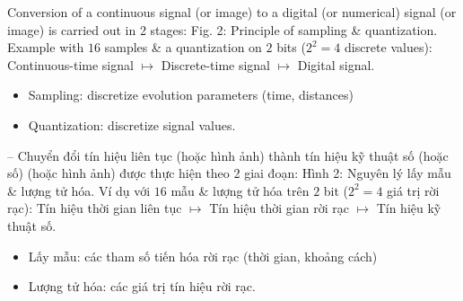\documentclass{article}
\begin{document}
\begin{itemize}
\begin{itemize}
        Conversion of a continuous signal (or image) to a digital (or numerical) signal (or image) is carried out in 2 stages: {\sf Fig. 2: Principle of sampling \& quantization. Example with $16$ samples \& a quantization on $2$ bits ($2^2 = 4$ discrete values): Continuous-time signal $\mapsto$ Discrete-time signal $\mapsto$ Digital signal.}
        \begin{itemize}
            \item Sampling: discretize evolution parameters (time, distances)
            \item Quantization: discretize signal values.
        \end{itemize}
        -- Chuyển đổi tín hiệu liên tục (hoặc hình ảnh) thành tín hiệu kỹ thuật số (hoặc số) (hoặc hình ảnh) được thực hiện theo 2 giai đoạn: {\sf Hình 2: Nguyên lý lấy mẫu \& lượng tử hóa. Ví dụ với $16$ mẫu \& lượng tử hóa trên $2$ bit ($2^2 = 4$ giá trị rời rạc): Tín hiệu thời gian liên tục $\mapsto$ Tín hiệu thời gian rời rạc $\mapsto$ Tín hiệu kỹ thuật số.}
        \begin{itemize}
            \item Lấy mẫu: các tham số tiến hóa rời rạc (thời gian, khoảng cách)
            \item Lượng tử hóa: các giá trị tín hiệu rời rạc.
        \end{itemize}        
    \end{itemize}
    

\end{itemize}
\end{document}
